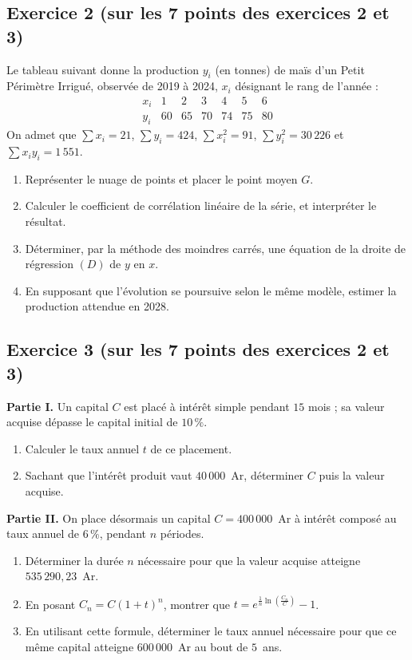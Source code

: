 \subsection*{Exercice 2 \textnormal{(sur les 7 points des exercices 2 et 3)}}

Le tableau suivant donne la production $y_{i}$ (en tonnes) de maïs d'un
Petit Périmètre Irrigué, observée de 2019 à 2024, $x_{i}$ désignant le rang
de l'année :
\[
  \begin{array}{c|cccccc}
    x_{i} & 1 & 2 & 3 & 4 & 5 & 6 \\
    \hline
    y_{i} & 60 & 65 & 70 & 74 & 75 & 80
  \end{array}
\]
On admet que $\sum x_{i} = 21$, $\sum y_{i} = 424$, $\sum x_{i}^{2} = 91$,
$\sum y_{i}^{2} = 30\,226$ et $\sum x_{i}y_{i} = 1\,551$.
\begin{enumerate}[label=\textbf{\arabic*.}, leftmargin=*, itemsep=0.2em]
  \item Représenter le nuage de points et placer le point moyen $G$.
  \item Calculer le coefficient de corrélation linéaire de la série, et
        interpréter le résultat.
  \item Déterminer, par la méthode des moindres carrés, une équation de la
        droite de régression $(D)$ de $y$ en $x$.
  \item En supposant que l'évolution se poursuive selon le même modèle,
        estimer la production attendue en 2028.
\end{enumerate}

\subsection*{Exercice 3 \textnormal{(sur les 7 points des exercices 2 et 3)}}

\textbf{Partie I.} Un capital $C$ est placé à intérêt simple pendant
$15$ mois ; sa valeur acquise dépasse le capital initial de $10\,\%$.
\begin{enumerate}[label=\textbf{\alph*)}, leftmargin=*, itemsep=0.15em]
  \item Calculer le taux annuel $t$ de ce placement.
  \item Sachant que l'intérêt produit vaut $40\,000$~Ar, déterminer $C$ puis
        la valeur acquise.
\end{enumerate}

\textbf{Partie II.} On place désormais un capital $C = 400\,000$~Ar à
intérêt composé au taux annuel de $6\,\%$, pendant $n$ périodes.
\begin{enumerate}[label=\textbf{\alph*)}, leftmargin=*, itemsep=0.15em]
  \item Déterminer la durée $n$ nécessaire pour que la valeur acquise atteigne
        $535\,290{,}23$~Ar.
  \item En posant $C_{n} = C(1+t)^{n}$, montrer que
        $t = e^{\frac1n\ln\left(\frac{C_{n}}{C}\right)}-1$.
  \item En utilisant cette formule, déterminer le taux annuel nécessaire
        pour que ce même capital atteigne $600\,000$~Ar au bout de $5$~ans.
\end{enumerate}

